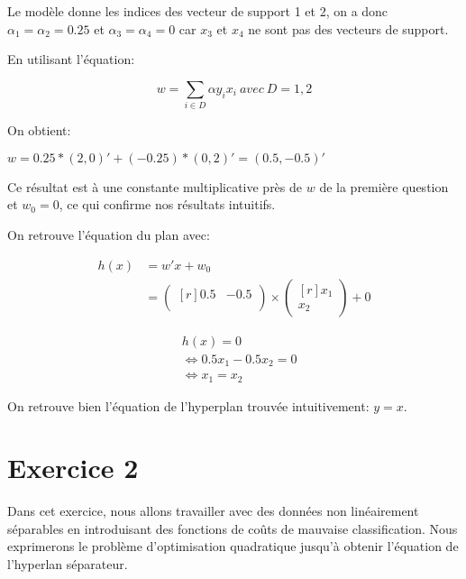 \documentclass{article}
\begin{document}
\begin{multicols}{2}
Le modèle donne les indices des vecteur de support 1 et 2, on a donc
$\alpha_1 = \alpha_2 = 0.25$ et $\alpha_3 = \alpha_4 = 0$ car $x_3$ et $x_4$ ne
sont pas des vecteurs de support.

En utilisant l'équation:

\begin{equation*}
    w = \sum_{i\in D}\alpha y_i x_i \ avec \ D = {1,2} 
\end{equation*}

On obtient:

$w = 0.25 * (2,0)' + (-0.25) * (0, 2)' = (0.5, -0.5)'$

Ce résultat est à une constante multiplicative près de $w$ de la première
question et $w_0 = 0$, ce qui confirme nos résultats intuitifs.

On retrouve l'équation du plan avec:

\begin{equation}
    \begin{split}
        h(x) &= w'x + w_0 \\
             &= \begin{pmatrix*}[r]
                    0.5 & -0.5 \\
                \end{pmatrix*} \times
                \begin{pmatrix*}[r]
                    x_1 \\
                    x_2
                \end{pmatrix*} + 0
    \end{split}
\end{equation}

\begin{equation}
    \begin{split}
        &h(x) = 0 \\
        &\iff 0.5 x_1 - 0.5 x_2 = 0 \\
        &\iff x_1 = x_2
    \end{split}
\end{equation}

On retrouve bien l'équation de l'hyperplan trouvée intuitivement: $y = x$.

\section{Exercice 2}\label{sec:ex2}

Dans cet exercice, nous allons travailler avec des données non linéairement
séparables en introduisant des fonctions de coûts de mauvaise classification.
Nous exprimerons le problème d'optimisation quadratique jusqu'à obtenir
l'équation de l'hyperlan séparateur.


\end{multicols}
\end{document}
